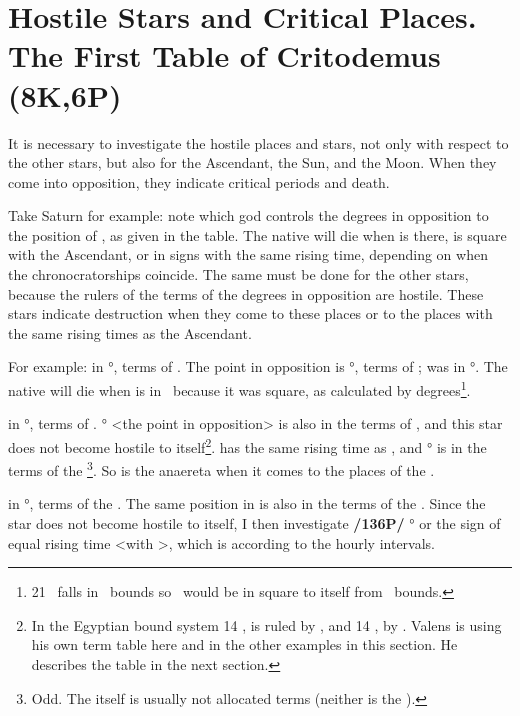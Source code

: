 \section{Hostile Stars and Critical Places. The First Table of Critodemus (8K,6P)}

It is necessary to investigate the hostile places and stars, not only with respect to the other stars, but also for the Ascendant, the Sun, and the Moon. When they come into opposition, they indicate critical periods and death. 

Take Saturn for example: note which god controls the degrees in opposition to the position of \Saturn, as given in the table. The native will die when \Saturn\xspace is there, is square with the Ascendant, or in signs with the same rising time, depending on when the chronocratorships coincide. The
same must be done for the other stars, because the rulers of the terms of the degrees in opposition are hostile. These stars indicate destruction when they come to these places or to the places with the same rising times as the Ascendant.

For example: \Saturn\xspace in \Cancer\xspace 21°, terms of \Venus. The point in opposition is \Capricorn\xspace 21°, terms
of \Mars; \Mars\xspace was in \Taurus\xspace 27°. The native will die when \Saturn\xspace is in \Virgo\, because it was square, as calculated by degrees\footnote{21 \Virgo\, falls in \Mars\, bounds so \Saturn\, would be in square to itself from \Mars\, bounds.}.

\Jupiter\xspace in \Scorpio\xspace 14°, terms of \Saturn. \Taurus\xspace 14° <the point in opposition> is also in the terms of \Saturn, and this star does not become hostile to itself\footnote{In the Egyptian bound system 14 \Scorpio, is ruled by \Mercury, and 14 \Taurus, by \Jupiter. Valens is using his own term table here and in the other examples in this section. He describes the table in the next section.}. \Leo\xspace has the same rising time as \Scorpio, and \Leo\xspace 14° is in the terms of the \Sun\footnote{Odd. The \Sun\xspace itself is usually not allocated terms (neither is the \Moon).}. So \Jupiter\xspace is the anaereta when it comes to the places of the \Sun.

\Mars\xspace in \Taurus\xspace 27°, terms of the \Sun. The same position in \Scorpio\xspace <the point in opposition> is also in the terms of the \Sun. Since the star does not become hostile to itself, I then investigate \textbf{/136P/} \Leo\xspace 27° or the sign of equal rising time <with \Taurus>, which is \Gemini\xspace according to the hourly intervals.

